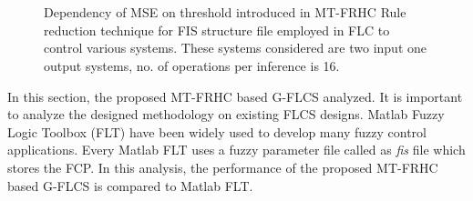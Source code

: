 \begin{figure}[h!]
	\centering
	\\
	 \\
	\caption{Dependency of MSE on threshold introduced in MT-FRHC Rule reduction technique for FIS structure file employed in FLC to control various systems. These systems considered are two input one output systems, no. of operations per inference is 16. }
	\label{fig:MSEvTH}
\end{figure}
In this section, the proposed MT-FRHC based G\hyp{}FLCS analyzed.  It is important to analyze the designed methodology on existing FLCS designs. Matlab Fuzzy Logic Toolbox (FLT) have been widely used to develop many fuzzy control applications. Every Matlab FLT uses a fuzzy parameter file called as \textit{fis} file which stores the FCP. In this analysis, the performance of the proposed MT-FRHC based G-FLCS is compared to Matlab FLT.

